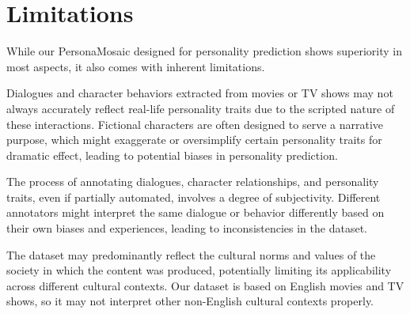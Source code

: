 \section*{Limitations}
While our PersonaMosaic designed for personality prediction shows superiority in most aspects, it also comes with inherent limitations.

Dialogues and character behaviors extracted from movies or TV shows may not always accurately reflect real-life personality traits due to the scripted nature of these interactions. Fictional characters are often designed to serve a narrative purpose, which might exaggerate or oversimplify certain personality traits for dramatic effect, leading to potential biases in personality prediction.

The process of annotating dialogues, character relationships, and personality traits, even if partially automated, involves a degree of subjectivity. Different annotators might interpret the same dialogue or behavior differently based on their own biases and experiences, leading to inconsistencies in the dataset.

The dataset may predominantly reflect the cultural norms and values of the society in which the content was produced, potentially limiting its applicability across different cultural contexts. Our dataset is based on English movies and TV shows, so it may not interpret other non-English cultural contexts properly.
